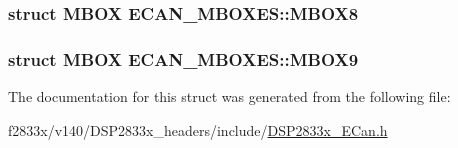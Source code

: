 \subsubsection[{M\+B\+O\+X8}]{\setlength{\rightskip}{0pt plus 5cm}struct {\bf M\+B\+O\+X} E\+C\+A\+N\+\_\+\+M\+B\+O\+X\+E\+S\+::\+M\+B\+O\+X8}\label{struct_e_c_a_n___m_b_o_x_e_s_a0a1d70030af8005354d808f5c85864ca}
\hypertarget{struct_e_c_a_n___m_b_o_x_e_s_ac3c9efea40d4477ad59dc8726a941192}{}
\subsubsection[{M\+B\+O\+X9}]{\setlength{\rightskip}{0pt plus 5cm}struct {\bf M\+B\+O\+X} E\+C\+A\+N\+\_\+\+M\+B\+O\+X\+E\+S\+::\+M\+B\+O\+X9}\label{struct_e_c_a_n___m_b_o_x_e_s_ac3c9efea40d4477ad59dc8726a941192}


The documentation for this struct was generated from the following file\+:\begin{DoxyCompactItemize}
\item 
f2833x/v140/\+D\+S\+P2833x\+\_\+headers/include/\hyperlink{_d_s_p2833x___e_can_8h}{D\+S\+P2833x\+\_\+\+E\+Can.\+h}\end{DoxyCompactItemize}
